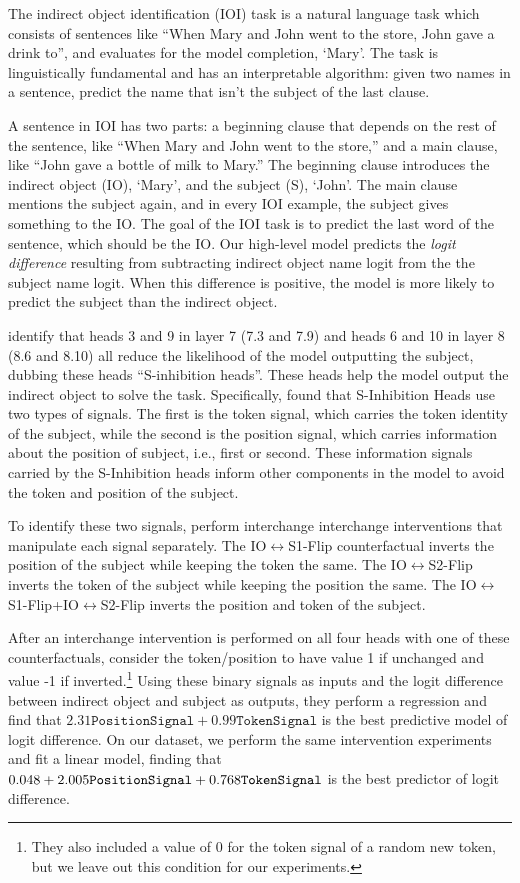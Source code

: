 \documentclass{article}
\theoremstyle{plain}
\theoremstyle{definition}
\theoremstyle{remark}
\newcommand{\tokensignal}{\texttt{TokenSignal}}
\newcommand{\positionsignal}{\texttt{PositionSignal}}
\begin{document}
The indirect object identification (IOI) task is a natural language task which consists of sentences like ``When Mary and John went to the store, John gave a drink to'', and evaluates for the model completion, `Mary'. The task is linguistically fundamental and has an interpretable algorithm: given two names in a sentence, predict the name that isn’t the
subject of the last clause.

A sentence in IOI has two parts: a beginning clause that depends on the rest of the sentence, like ``When Mary and John went to the store,'' and a main clause, like ``John gave a bottle of milk to Mary.'' The beginning clause introduces the indirect object (IO), `Mary', and the subject (S), `John'. The main clause mentions the subject again, and in every IOI example, the subject gives something to the IO. The goal of the IOI task is to predict the last word of the sentence, which should be the IO. Our high-level model predicts the \textit{logit difference} resulting from subtracting indirect object name logit from the the subject name logit. When this difference is positive, the model is more likely to predict the subject than the indirect object. 

\cite{wang2022interpretability} identify that heads 3 and 9 in layer 7 (7.3 and 7.9) and heads 6 and 10 in layer 8 (8.6 and 8.10) all reduce the likelihood of the model outputting the subject, dubbing these heads ``S-inhibition heads''. These heads help the model output the indirect object to solve the task. Specifically, \citet{wang2022interpretability} found that S-Inhibition Heads use two types of signals. The first is the token signal, which carries the token identity of the subject, while the second is the position signal, which carries information about the position of subject, i.e., first or second. These information signals carried by the S-Inhibition heads inform other components in the model to avoid the token and position of the subject.

To identify these two signals, \citet{wang2022interpretability} perform interchange interchange interventions that manipulate each signal separately. The IO$\leftrightarrow$S1-Flip counterfactual inverts the position of the subject while keeping the token the same. The IO$\leftrightarrow$S2-Flip inverts the token of the subject while keeping the position the same. The IO$\leftrightarrow$S1-Flip+IO$\leftrightarrow$S2-Flip inverts the position and token of the subject.

After an interchange intervention is performed on all four heads with one of these counterfactuals, \citet{wang2022interpretability} consider the token/position to have value 1 if unchanged and value -1 if inverted.\footnote{They also included a value of $0$ for the token signal of a random new token, but we leave out this condition for our experiments.} Using these binary signals as inputs and the logit difference between indirect object and subject as outputs, they perform a regression and find that $2.31\positionsignal + 0.99\tokensignal$ is the best predictive model of logit difference. On our dataset, we perform the same intervention experiments and fit a linear model, finding that  $\IOIbias + \positioncoef \positionsignal + \tokencoef \tokensignal$ is the best predictor of logit difference. 
\end{document}
